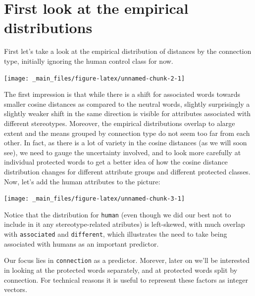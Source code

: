\documentclass[
  12pt,
]{book}
\begin{document}
\hypertarget{first-look-at-the-empirical-distributions}{%
\section{First look at the empirical distributions}\label{first-look-at-the-empirical-distributions}}

First let's take a look at the empirical distribution of distances by the connection type, initially ignoring the human control class for now.

\vspace{1mm}
\footnotesize

\begin{center}\texttt{[image: \_main\_files/figure-latex/unnamed-chunk-2-1]} \end{center}
\normalsize

The first impression is that while there is a shift for associated words towards smaller cosine distances as compared to the neutral words, slightly surprisingly a slightly weaker shift in the same direction is visible for attributes associated with different stereotypes. Moreover, the empirical distributions overlap to alarge extent and the means grouped by connection type do not seem too far from each other. In fact, as there is a lot of variety in the cosine distances (as we will soon see), we need to gauge the uncertainty involved, and to look more carefully at individual protected words to get a better idea of how the cosine distance distribution changes for different attribute groups and different protected classes. Now, let's add the human attributes to the picture:

\vspace{1mm}
\footnotesize

\begin{center}\texttt{[image: \_main\_files/figure-latex/unnamed-chunk-3-1]} \end{center}
\normalsize

\noindent Notice that the distribution for \texttt{human} (even though we did our best not to include in it any stereotype-related atributes) is left-skewed, with much overlap with \texttt{associated} and \texttt{different}, which illustrates the need to take being associated with humans as an important predictor.

Our focus lies in \texttt{connection} as a predictor. Morever, later on we'll be interested in looking at the protected words separately, and at protected words split by connection. For technical reasons it is useful to represent these factors as integer vectors.
\end{document}
